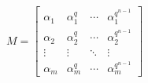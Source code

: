 \documentclass[12pt]{article}
\begin{document}
${ \displaystyle
   M =
   \begin{bmatrix}
     \alpha_1 & \alpha_1^q & \cdots & \alpha_1^{q^{n - 1}} \\
     \alpha_2 & \alpha_2^q & \cdots & \alpha_2^{q^{n - 1}} \\
     \vdots   & \vdots     & \ddots & \vdots             \\
     \alpha_m & \alpha_m^q & \cdots & \alpha_m^{q^{n - 1}}
   \end{bmatrix}
}$
\end{document}

